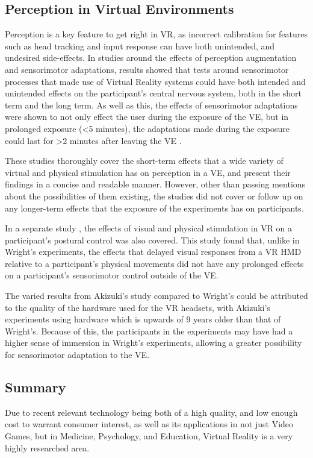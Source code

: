 		\subsection{Perception in Virtual Environments}
		\label{lr:vr:perception}
			Perception is a key feature to get right in VR, as incorrect calibration for features such as head tracking and input response can have both unintended, and undesired side-effects. In studies \cite{Wright2006}  \cite{Wright2009} \cite{Wright2011} \cite{Wright2013} \cite{Wright2014} around the effects of perception augmentation and sensorimotor adaptations, results showed that tests around sensorimotor processes that made use of Virtual Reality systems could have both intended and unintended effects on the participant's central nervous system, both in the short term and the long term.
			As well as this, the effects of sensorimotor adaptations were shown to not only effect the user during the exposure of the VE, but in prolonged exposure (<5 minutes), the adaptations made during the exposure could last for >2 minutes after leaving the VE \cite{Wright2013}.

			These studies thoroughly cover the short-term effects that a wide variety of virtual and physical stimulation has on perception in a VE, and present their findings in a concise and readable manner.
			However, other than passing mentions about the possibilities of them existing, the studies did not cover or follow up on any longer-term effects that the exposure of the experiments has on participants.

			In a separate study \cite{Akizuki2005}, the effects of visual and physical stimulation in VR on a participant's postural control was also covered.
			This study found that, unlike in Wright's experiments, the effects that delayed visual responses from a VR HMD relative to a participant's physical movements did not have any prolonged effects on a participant's sensorimotor control outside of the VE.

			The varied results from Akizuki's study compared to Wright's could be attributed to the quality of the hardware used for the VR headsets, with Akizuki's experiments using hardware which is upwards of 9 years older than that of Wright's.
			Because of this, the participants in the experiments may have had a higher sense of immersion in Wright's experiments, allowing a greater possibility for sensorimotor adaptation to the VE.

		\subsection{Summary}
		\label{lr:vr:conclusion}
			Due to recent relevant technology being both of a high quality, and low enough cost to warrant consumer interest, as well as its applications in not just Video Games, but in Medicine, Psychology, and Education, Virtual Reality is a very highly researched area.

